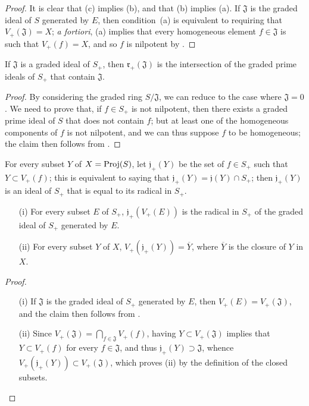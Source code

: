 \begin{proof}
It is clear that (c) implies (b), and that (b) implies (a).
If $\mathfrak{J}$ is the graded ideal of $S$ generated by $E$, then condition~(a) is equivalent to requiring that $V_+(\mathfrak{J})=X$;
\emph{a fortiori}, (a) implies that every homogeneous element $f\in\mathfrak{J}$ is such that $V_+(f)=X$, and so $f$ is nilpotent by .
\end{proof}

\begin{corollary}[2.3.9]
\label{II.2.3.9}
If $\mathfrak{J}$ is a graded ideal of $S_+$, then $\mathfrak{r}_+(\mathfrak{J})$ is the intersection of the graded prime ideals of $S_+$ that contain $\mathfrak{J}$.
\end{corollary}

\begin{proof}
By considering the graded ring $S/\mathfrak{J}$, we can reduce to the case where $\mathfrak{J}=0$.
We need to prove that, if $f\in S_+$ is not nilpotent, then there exists a graded prime ideal of $S$ that does not contain $f$;
but at least one of the homogeneous components of $f$ is not nilpotent, and we can thus suppose $f$ to be homogeneous;
the claim then follows from .
\end{proof}

\begin{env}[2.3.10]
\label{II.2.3.10}
For every subset $Y$ of $X=\operatorname{Proj}(S)$, let $\mathfrak{j}_+(Y)$ be the set of $f\in S_+$ such that $Y\subset V_+(f)$;
this is equivalent to saying that $\mathfrak{j}_+(Y)=\mathfrak{j}(Y)\cap S_+$;
then $\mathfrak{j}_+(Y)$ is an ideal of $S_+$ that is equal to its radical in $S_+$.
\end{env}

\begin{proposition}[2.3.11]
\label{II.2.3.11}
\begin{enumerate}
  \item[{\rm(i)}] For every subset $E$ of $S_+$, $\mathfrak{j}_+(V_+(E))$ is the radical in $S_+$ of the graded ideal of $S_+$ generated by $E$.
  \item[{\rm(ii)}] For every subset $Y$ of $X$, $V_+(\mathfrak{j}_+(Y))=\overline{Y}$, where $\overline{Y}$ is the closure of $Y$ in $X$.
\end{enumerate}
\end{proposition}

\begin{proof}
\medskip\noindent
\begin{enumerate}
  \item[{\rm(i)}] If $\mathfrak{J}$ is the graded ideal of $S_+$ generated by $E$, then $V_+(E)=V_+(\mathfrak{J})$, and the claim then follows from .
  \item[{\rm(ii)}] Since $V_+(\mathfrak{J})=\bigcap_{f\in\mathfrak{J}}V_+(f)$, having $Y\subset V_+(\mathfrak{J})$ implies that $Y\subset V_+(f)$ for every $f\in\mathfrak{J}$, and thus $\mathfrak{j}_+(Y)\supset\mathfrak{J}$, whence $V_+(\mathfrak{j}_+(Y))\subset V_+(\mathfrak{J})$, which proves (ii) by the definition of the closed subsets.
\end{enumerate}
\end{proof}

